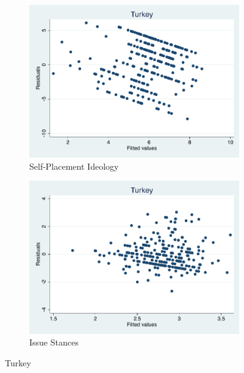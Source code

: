 \documentclass[12pt, titlepage]{article}
\begin{document}
\begin{figure}[H]
	\centering
	\begin{subfigure}[b]{0.475\textwidth}   
		\centering 
		\includegraphics[width=\textwidth]{Residuals/CountryIdeo/Turkey}
		\caption{Self-Placement Ideology}
	\end{subfigure}
	\hfill
	\begin{subfigure}[b]{0.475\textwidth}
		\centering 
		\includegraphics[width=\textwidth]{Residuals/CountryLib/Turkey}
		\caption{Issue Stances}
	\end{subfigure}
	\caption{Turkey}
	\label{Turkey}
\end{figure}
\end{document}
